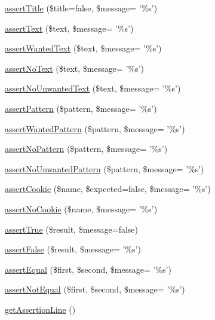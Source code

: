\begin{DoxyCompactItemize}
\item 
\hyperlink{class_web_test_case_a8639e24b9991384e695dbe58719bc6b8}{assertTitle} (\$title=false, \$message= '\%s')
\item 
\hyperlink{class_web_test_case_aa458bde36e4dd8038e76974c42fe4822}{assertText} (\$text, \$message= '\%s')
\item 
\hyperlink{class_web_test_case_aba9b544e11cbfdd2e34ec34fefed908a}{assertWantedText} (\$text, \$message= '\%s')
\item 
\hyperlink{class_web_test_case_a1a2b021f72bbc8ec114df0558b882bf6}{assertNoText} (\$text, \$message= '\%s')
\item 
\hyperlink{class_web_test_case_ad05b092ba3b7e8f70c640504ec57538f}{assertNoUnwantedText} (\$text, \$message= '\%s')
\item 
\hyperlink{class_web_test_case_afb9fdc739351627f08f50412a5313f0a}{assertPattern} (\$pattern, \$message= '\%s')
\item 
\hyperlink{class_web_test_case_adfb5d7b168c179976f9aee9447e914e9}{assertWantedPattern} (\$pattern, \$message= '\%s')
\item 
\hyperlink{class_web_test_case_a9c818bf7a210f58e765cc503e8cb69ea}{assertNoPattern} (\$pattern, \$message= '\%s')
\item 
\hyperlink{class_web_test_case_a3bd8aaa61421d81544c32e617cddbcd1}{assertNoUnwantedPattern} (\$pattern, \$message= '\%s')
\item 
\hyperlink{class_web_test_case_aabfb7913fcd6e94811a9029f848117e8}{assertCookie} (\$name, \$expected=false, \$message= '\%s')
\item 
\hyperlink{class_web_test_case_a5531615ad22f67d48ce596041c43f545}{assertNoCookie} (\$name, \$message= '\%s')
\item 
\hyperlink{class_web_test_case_a13f27b3d3f2db36087e3a5e40299ada0}{assertTrue} (\$result, \$message=false)
\item 
\hyperlink{class_web_test_case_a5e382bdb9f868a57664882f71fbff183}{assertFalse} (\$result, \$message= '\%s')
\item 
\hyperlink{class_web_test_case_adb76e8a343c2a422654b3d464e95bf94}{assertEqual} (\$first, \$second, \$message= '\%s')
\item 
\hyperlink{class_web_test_case_a09e9b91f3e29ff7f36be218413238f73}{assertNotEqual} (\$first, \$second, \$message= '\%s')
\item 
\hyperlink{class_web_test_case_a4fa60ab738d6c9ada4a4199698549fd2}{getAssertionLine} ()
\end{DoxyCompactItemize}

